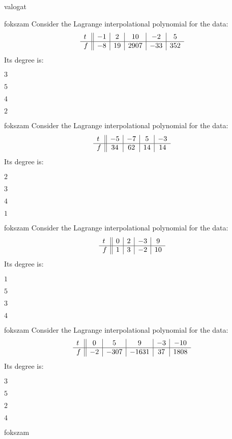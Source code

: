 \documentclass[12pt]{article}
\begin{document}
\begin{quiz}{valogat}
\begin{multi}{fokszam}
Consider the Lagrange interpolational polynomial for the data:
$$\begin{array}{l ||c|c|c|c|c}t&-1&2&10&-2&5\\ \hline f&-8&19&2907&-33&352 \\ \end{array}$$
Its degree is:
\item* $ 3 $
\item  $ 5 $
\item  $ 4 $
\item  $ 2 $
\end{multi}
\begin{multi}{fokszam}
Consider the Lagrange interpolational polynomial for the data:
$$\begin{array}{l ||c|c|c|c}t&-5&-7&5&-3\\ \hline f&34&62&14&14 \\ \end{array}$$
Its degree is:
\item* $ 2 $
\item  $ 3 $
\item  $ 4 $
\item  $ 1 $
\end{multi}
\begin{multi}{fokszam}
Consider the Lagrange interpolational polynomial for the data:
$$\begin{array}{l ||c|c|c|c}t&0&2&-3&9\\ \hline f&1&3&-2&10 \\ \end{array}$$
Its degree is:
\item* $ 1 $
\item  $ 5 $
\item  $ 3 $
\item  $ 4 $
\end{multi}
\begin{multi}{fokszam}
Consider the Lagrange interpolational polynomial for the data:
$$\begin{array}{l ||c|c|c|c|c}t&0&5&9&-3&-10\\ \hline f&-2&-307&-1631&37&1808 \\ \end{array}$$
Its degree is:
\item* $ 3 $
\item  $ 5 $
\item  $ 2 $
\item  $ 4 $
\end{multi}
\begin{multi}{fokszam}

\end{multi}
\end{quiz}
\end{document}
